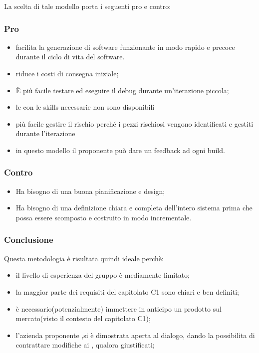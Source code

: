 La scelta di tale modello porta i seguenti pro e contro:\\
\subsubsection{\textbf{Pro}}
\begin{itemize}
    \item facilita la generazione di software funzionante in modo rapido e precoce durante il ciclo di vita del software.
    \item riduce i costi di consegna iniziale;
    \item È più facile testare ed eseguire il debug durante un'iterazione piccola;
    \item le  con le skills necessarie non sono disponibili
    \item più facile gestire il rischio perché i pezzi rischiosi vengono identificati e gestiti durante l'iterazione
    \item in questo modello il proponente può dare un feedback ad ogni build.
\end{itemize}
\subsubsection{\textbf{Contro}}
\begin{itemize}
    \item Ha bisogno di una buona pianificazione e design;
    \item Ha bisogno di una definizione chiara e completa dell'intero sistema prima che possa essere scomposto e costruito in modo incrementale.
\end{itemize}
\subsubsection{\textbf{Conclusione}}
Questa metodologia è risultata quindi ideale perchè:
\begin{itemize}
    \item il livello  di esperienza del gruppo \Gruppo{} è mediamente limitato;
    \item la maggior parte dei requisiti del capitolato C1 sono chiari e ben definiti;
    \item è necessario(potenzialmente) immettere in anticipo un prodotto sul mercato(visto il contesto del capitolato C1);
    \item l'azienda proponente \proponente{},si è dimostrata aperta al dialogo, dando la possibilita di contrattare modifiche ai  , qualora giustificati;
\end{itemize}
